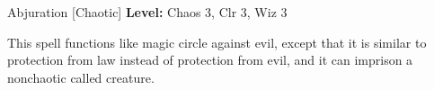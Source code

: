 {Abjuration [Chaotic]}
{
	\textbf{Level:}
	Chaos 3, Clr 3, Wiz 3\\
}
{
	This spell functions like magic circle against evil, except that it is similar to protection from law instead of protection from evil, and it can imprison a nonchaotic called creature.

}
